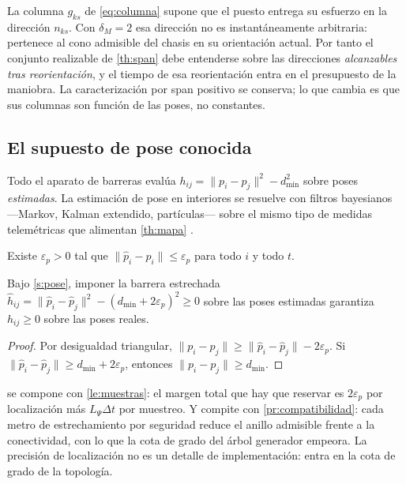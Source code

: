 \begin{observacion}
\label{obs:movilidad-agarre}
La columna $g_{ks}$ de \eqref{eq:columna} supone que el puesto entrega su
esfuerzo en la dirección $n_{ks}$. Con $\delta_M=2$ esa dirección no es
instantáneamente arbitraria: pertenece al cono admisible del chasis en su
orientación actual. Por tanto el conjunto realizable de \cref{th:span} debe
entenderse sobre las direcciones \emph{alcanzables tras reorientación}, y el
tiempo de esa reorientación entra en el presupuesto de la maniobra. La
caracterización por span positivo se conserva; lo que cambia es que sus columnas
son función de las poses, no constantes.
\end{observacion}

\subsection{El supuesto de pose conocida}

Todo el aparato de barreras evalúa $h_{ij}=\|p_i-p_j\|^2-d_{\min}^2$ sobre poses
\emph{estimadas}. La estimación de pose en interiores se resuelve con filtros
bayesianos —Markov, Kalman extendido, partículas— sobre el mismo tipo de medidas
telemétricas que alimentan \cref{th:mapa} \cite{siegwart2011introduction,thrun2005probabilistic}.

\begin{supuesto}
\label{s:pose}
Existe $\varepsilon_p>0$ tal que $\|\hat p_i-p_i\|\le\varepsilon_p$ para todo $i$
y todo $t$.
\end{supuesto}

\begin{proposicion}
\label{pr:pose}
Bajo \cref{s:pose}, imponer la barrera estrechada
$\hat h_{ij}=\|\hat p_i-\hat p_j\|^2-(d_{\min}+2\varepsilon_p)^2\ge0$ sobre las
poses estimadas garantiza $h_{ij}\ge0$ sobre las poses reales.
\end{proposicion}

\begin{proof}
Por desigualdad triangular,
$\|p_i-p_j\|\ge\|\hat p_i-\hat p_j\|-2\varepsilon_p$. Si
$\|\hat p_i-\hat p_j\|\ge d_{\min}+2\varepsilon_p$, entonces
$\|p_i-p_j\|\ge d_{\min}$.
\end{proof}

\begin{observacion}
\label{obs:coste-pose}
 se compone con \cref{le:muestras}: el margen total que hay que
reservar es $2\varepsilon_p$ por localización más $L_\Psi\Delta t$ por muestreo.
Y compite con \cref{pr:compatibilidad}: cada metro de estrechamiento por
seguridad reduce el anillo admisible frente a la conectividad, con lo que la
cota de grado del árbol generador empeora. La precisión de localización no es un
detalle de implementación: entra en la cota de grado de la topología.
\end{observacion}

